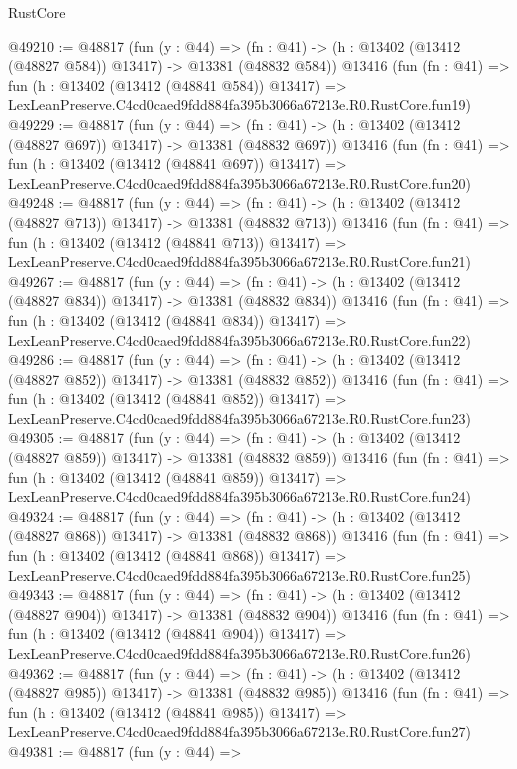 \begin{lexlean}{RustCore}
\begin{coremodule}
@49210 := @48817
    (fun (y : @44) =>
    (fn : @41) -> (h : @13402 (@13412 (@48827 @584)) @13417) -> @13381 (@48832 @584))
    @13416
    (fun (fn : @41) =>
    fun (h : @13402 (@13412 (@48841 @584)) @13417) =>
    LexLeanPreserve.C4cd0caed9fdd884fa395b3066a67213e.R0.RustCore.fun19)
@49229 := @48817
    (fun (y : @44) =>
    (fn : @41) -> (h : @13402 (@13412 (@48827 @697)) @13417) -> @13381 (@48832 @697))
    @13416
    (fun (fn : @41) =>
    fun (h : @13402 (@13412 (@48841 @697)) @13417) =>
    LexLeanPreserve.C4cd0caed9fdd884fa395b3066a67213e.R0.RustCore.fun20)
@49248 := @48817
    (fun (y : @44) =>
    (fn : @41) -> (h : @13402 (@13412 (@48827 @713)) @13417) -> @13381 (@48832 @713))
    @13416
    (fun (fn : @41) =>
    fun (h : @13402 (@13412 (@48841 @713)) @13417) =>
    LexLeanPreserve.C4cd0caed9fdd884fa395b3066a67213e.R0.RustCore.fun21)
@49267 := @48817
    (fun (y : @44) =>
    (fn : @41) -> (h : @13402 (@13412 (@48827 @834)) @13417) -> @13381 (@48832 @834))
    @13416
    (fun (fn : @41) =>
    fun (h : @13402 (@13412 (@48841 @834)) @13417) =>
    LexLeanPreserve.C4cd0caed9fdd884fa395b3066a67213e.R0.RustCore.fun22)
@49286 := @48817
    (fun (y : @44) =>
    (fn : @41) -> (h : @13402 (@13412 (@48827 @852)) @13417) -> @13381 (@48832 @852))
    @13416
    (fun (fn : @41) =>
    fun (h : @13402 (@13412 (@48841 @852)) @13417) =>
    LexLeanPreserve.C4cd0caed9fdd884fa395b3066a67213e.R0.RustCore.fun23)
@49305 := @48817
    (fun (y : @44) =>
    (fn : @41) -> (h : @13402 (@13412 (@48827 @859)) @13417) -> @13381 (@48832 @859))
    @13416
    (fun (fn : @41) =>
    fun (h : @13402 (@13412 (@48841 @859)) @13417) =>
    LexLeanPreserve.C4cd0caed9fdd884fa395b3066a67213e.R0.RustCore.fun24)
@49324 := @48817
    (fun (y : @44) =>
    (fn : @41) -> (h : @13402 (@13412 (@48827 @868)) @13417) -> @13381 (@48832 @868))
    @13416
    (fun (fn : @41) =>
    fun (h : @13402 (@13412 (@48841 @868)) @13417) =>
    LexLeanPreserve.C4cd0caed9fdd884fa395b3066a67213e.R0.RustCore.fun25)
@49343 := @48817
    (fun (y : @44) =>
    (fn : @41) -> (h : @13402 (@13412 (@48827 @904)) @13417) -> @13381 (@48832 @904))
    @13416
    (fun (fn : @41) =>
    fun (h : @13402 (@13412 (@48841 @904)) @13417) =>
    LexLeanPreserve.C4cd0caed9fdd884fa395b3066a67213e.R0.RustCore.fun26)
@49362 := @48817
    (fun (y : @44) =>
    (fn : @41) -> (h : @13402 (@13412 (@48827 @985)) @13417) -> @13381 (@48832 @985))
    @13416
    (fun (fn : @41) =>
    fun (h : @13402 (@13412 (@48841 @985)) @13417) =>
    LexLeanPreserve.C4cd0caed9fdd884fa395b3066a67213e.R0.RustCore.fun27)
@49381 := @48817
    (fun (y : @44) =>

\end{coremodule}
\end{lexlean}
